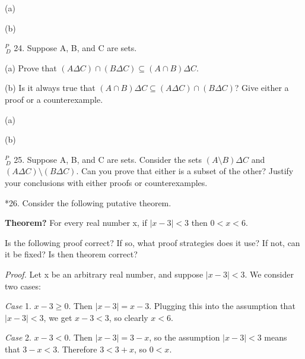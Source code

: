\documentclass{article}
\begin{document}
\vspace{30pt}

(a)

\vspace{30pt}

(b)

\vspace{30pt}

$^{\textit{P}}_{\, \textit{D}}$ 24. Suppose A, B, and C are sets.

\hspace{12pt}(a) Prove that $(A \Delta C) \cap (B \Delta C) \subseteq (A \cap B) \Delta C$.

\hspace{12pt}(b) Is it always true that $(A \cap B) \Delta C \subseteq (A \Delta C) \cap (B \Delta C)$? Give
either a proof or a counterexample.

\vspace{30pt}

(a)

\vspace{30pt}

(b)

\vspace{30pt}

$^{\textit{P}}_{\, \textit{D}}$ 25. Suppose A, B, and C are sets. Consider the sets $(A \setminus B) \Delta C$ and
$(A \Delta C) \setminus (B \Delta C)$. Can you prove that either is a subset of the other?
Justify your conclusions with either proofs or counterexamples.

\vspace{30pt}



\vspace{30pt}

*26. Consider the following putative theorem.

\textbf{Theorem?} For every real number x, if $|x - 3| < 3$ then $0 < x < 6$.

Is the following proof correct? If so, what proof strategies does it use?
If not, can it be fixed? Is then theorem correct?

\textit{Proof.} Let x be an arbitrary real number, and suppose $|x - 3| < 3$. We
consider two cases:

\textit{Case} 1. $x - 3 \geq 0$. Then $|x - 3| = x - 3$. Plugging this into the assumption
that $|x - 3| < 3$, we get $x - 3 < 3$, so clearly $x < 6$.

\textit{Case} 2. $x - 3 < 0$. Then $|x - 3| = 3 - x$, so the assumption $|x - 3| < 3$ means that $3 - x < 3$. Therefore $3 < 3 + x$, so $0 < x$.
\end{document}
